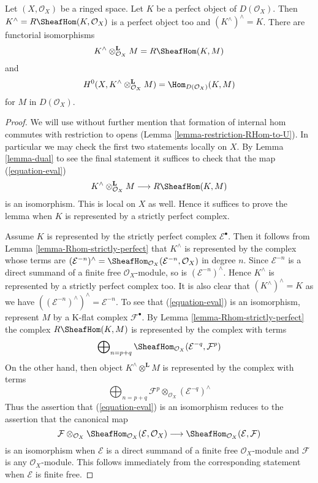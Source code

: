 \begin{lemma}
\label{lemma-dual-perfect-complex}
Let $(X, \mathcal{O}_X)$ be a ringed space. Let $K$ be a perfect object of
$D(\mathcal{O}_X)$. Then $K^\wedge = R\SheafHom(K, \mathcal{O}_X)$ is a
perfect object too and $(K^\wedge)^\wedge = K$. There are
functorial isomorphisms
$$
K^\wedge \otimes^\mathbf{L}_{\mathcal{O}_X} M = R\SheafHom(K, M)
$$
and
$$
H^0(X, K^\wedge \otimes_{\mathcal{O}_X}^\mathbf{L} M) =
\Hom_{D(\mathcal{O}_X)}(K, M)
$$
for $M$ in $D(\mathcal{O}_X)$.
\end{lemma}

\begin{proof}
We will use without further mention that formation of internal hom commutes
with restriction to opens (Lemma \ref{lemma-restriction-RHom-to-U}).
In particular we may check the first two statements locally on $X$.
By Lemma \ref{lemma-dual} to see the final statement it suffices to check
that the map (\ref{equation-eval})
$$
K^\wedge \otimes^\mathbf{L}_{\mathcal{O}_X} M
\longrightarrow
R\SheafHom(K, M)
$$
is an isomorphism. This is local on $X$ as well.
Hence it suffices to prove the lemma when $K$ is represented
by a strictly perfect complex.

\medskip\noindent
Assume $K$ is represented by the strictly perfect complex
$\mathcal{E}^\bullet$. Then it follows from
Lemma \ref{lemma-Rhom-strictly-perfect}
that $K^\wedge$ is represented by the complex whose terms are
$(\mathcal{E}^{-n})^\wedge =
\SheafHom_{\mathcal{O}_X}(\mathcal{E}^{-n}, \mathcal{O}_X)$
in degree $n$. Since $\mathcal{E}^{-n}$ is a direct summand of a finite
free $\mathcal{O}_X$-module, so is $(\mathcal{E}^{-n})^\wedge$.
Hence $K^\wedge$ is represented by a strictly perfect complex too.
It is also clear that $(K^\wedge)^\wedge = K$ as we have
$((\mathcal{E}^{-n})^\wedge)^\wedge = \mathcal{E}^{-n}$.
To see that (\ref{equation-eval}) is an isomorphism, represent
$M$ by a K-flat complex $\mathcal{F}^\bullet$.
By Lemma \ref{lemma-Rhom-strictly-perfect} the complex
$R\SheafHom(K, M)$ is represented by the complex with terms
$$
\bigoplus\nolimits_{n = p + q}
\SheafHom_{\mathcal{O}_X}(\mathcal{E}^{-q}, \mathcal{F}^p)
$$
On the other hand, then object $K^\wedge \otimes^\mathbf{L} M$
is represented by the complex with terms
$$
\bigoplus\nolimits_{n = p + q}
\mathcal{F}^p \otimes_{\mathcal{O}_X} (\mathcal{E}^{-q})^\wedge
$$
Thus the assertion that (\ref{equation-eval}) is an isomorphism
reduces to the assertion that the canonical map
$$
\mathcal{F}
\otimes_{\mathcal{O}_X}
\SheafHom_{\mathcal{O}_X}(\mathcal{E}, \mathcal{O}_X)
\longrightarrow
\SheafHom_{\mathcal{O}_X}(\mathcal{E}, \mathcal{F})
$$
is an isomorphism when $\mathcal{E}$ is a direct summand of a finite
free $\mathcal{O}_X$-module and $\mathcal{F}$ is any $\mathcal{O}_X$-module.
This follows immediately from the corresponding statement when
$\mathcal{E}$ is finite free.
\end{proof}








